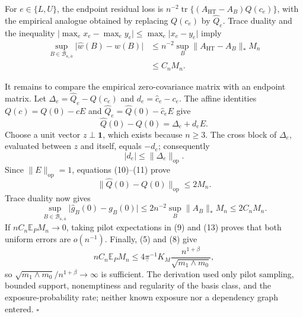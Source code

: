 For \(e\in\{L,U\}\), the endpoint residual loss is \(n^{-2}\operatorname{tr}\{(A_{\mathrm{HT}}-A_B)Q(c_e)\}\), with the empirical analogue obtained by replacing \(Q(c_e)\) by \(\widehat Q_e\).  Trace duality and the inequality \(\lvert\max_e x_e-\max_e y_e\rvert\le\max_e\lvert x_e-y_e\rvert\) imply
\[
\begin{aligned}
\sup_{B\in\mathcal B_{\kappa,\overline a}}
\lvert\widehat w(B)-w(B)\rvert
&\le n^{-2}\sup_B
\lVert A_{\mathrm{HT}}-A_B\rVert_*M_n\\
&\le C_nM_n.
\end{aligned}
\tag{9}
\]

It remains to compare the empirical zero-covariance matrix with an endpoint matrix.  Let \(\Delta_e=\widehat Q_e-Q(c_e)\) and \(d_e=\widehat c_e-c_e\).  The affine identities \(Q(c)=Q(0)-cE\) and \(\widehat Q_e=\widehat Q(0)-\widehat c_eE\) give
\[
\widehat Q(0)-Q(0)=\Delta_e+d_eE.
\tag{10}
\]
Choose a unit vector \(z\perp\mathbf1\), which exists because \(n\ge3\).  The cross block of \(\Delta_e\), evaluated between \(z\) and itself, equals \(-d_e\); consequently
\[
\lvert d_e\rvert\le\lVert\Delta_e\rVert_{\mathrm{op}}.
\tag{11}
\]
Since \(\lVert E\rVert_{\mathrm{op}}=1\), equations (10)--(11) prove
\[
\lVert\widehat Q(0)-Q(0)\rVert_{\mathrm{op}}\le2M_n.
\tag{12}
\]
Trace duality now gives
\[
\sup_{B\in\mathcal B_{\kappa,\overline a}}
\lvert\widehat g_B(0)-g_B(0)\rvert
\le2n^{-2}\sup_B\lVert A_B\rVert_*M_n
\le2C_nM_n.
\tag{13}
\]
If \(nC_n\mathbb E_PM_n\to0\), taking pilot expectations in (9) and (13) proves that both uniform errors are \(o(n^{-1})\).  Finally, (5) and (8) give
\[
nC_n\mathbb E_PM_n
\le4\underline\pi^{-1}K_M
\frac{n^{1+\beta}}{\sqrt{m_1\wedge m_0}},
\tag{14}
\]
so \(\sqrt{m_1\wedge m_0}/n^{1+\beta}\to\infty\) is sufficient.  The derivation used only pilot sampling, bounded support, nonemptiness and regularity of the basis class, and the exposure-probability rate; neither known exposure nor a dependency graph entered. \(\square\)